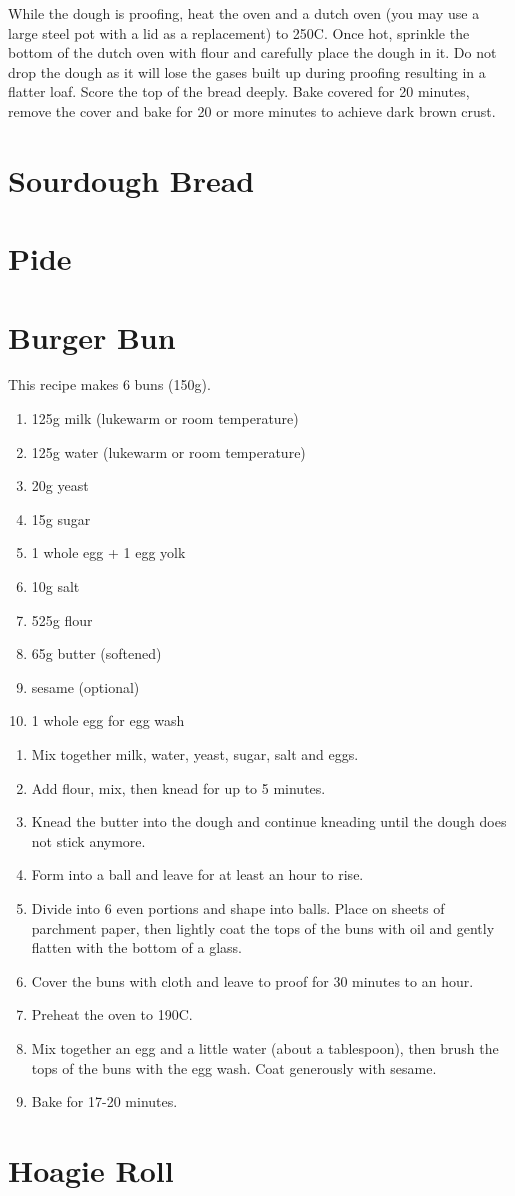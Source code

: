 While the dough is proofing, heat the oven and a dutch oven (you may use a
large steel pot with a lid as a replacement) to 250C. Once hot, sprinkle the
bottom of the dutch oven with flour and carefully place the dough in it. Do not
drop the dough as it will lose the gases built up during proofing resulting in
a flatter loaf. Score the top of the bread deeply. Bake covered for 20 minutes,
remove the cover and bake for 20 or more minutes to achieve dark brown crust.

\section{Sourdough Bread}
\section{Pide}
\section{Burger Bun}
This recipe makes 6 buns (150g).

\begin{enumerate}
  \item 125g milk (lukewarm or room temperature)
  \item 125g water (lukewarm or room temperature)
  \item 20g yeast
  \item 15g sugar
  \item 1 whole egg + 1 egg yolk
  \item 10g salt
  \item 525g flour
  \item 65g butter (softened)
  \item sesame (optional)
  \item 1 whole egg for egg wash
\end{enumerate}

\begin{enumerate}
  \item Mix together milk, water, yeast, sugar, salt and eggs.
  \item Add flour, mix, then knead for up to 5 minutes.
  \item Knead the butter into the dough and continue kneading until the dough
  does not stick anymore.
  \item Form into a ball and leave for at least an hour to rise.
  \item Divide into 6 even portions and shape into balls. Place on sheets of
  parchment paper, then lightly coat the tops of the buns with oil and gently
  flatten with the bottom of a glass.
  \item Cover the buns with cloth and leave to proof for 30 minutes to an hour.
  \item Preheat the oven to 190C.
  \item Mix together an egg and a little water (about a tablespoon), then brush
  the tops of the buns with the egg wash. Coat generously with sesame.
  \item Bake for 17-20 minutes.
\end{enumerate}

\section{Hoagie Roll}
